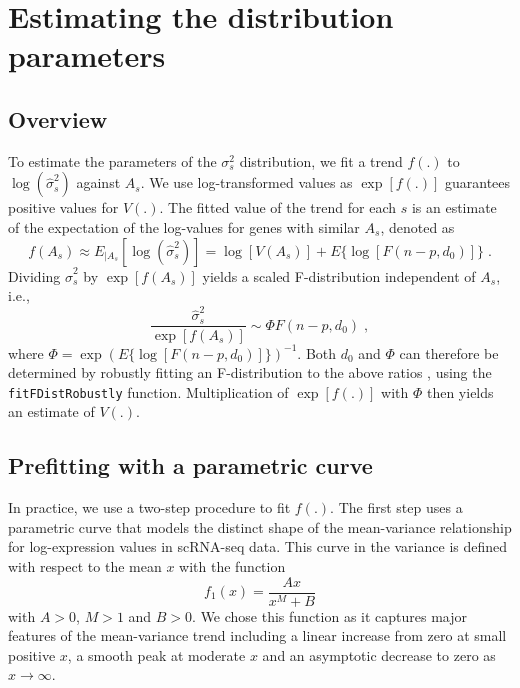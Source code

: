 \documentclass{article}
\begin{document}
\section{Estimating the distribution parameters}

\subsection{Overview}
To estimate the parameters of the $\sigma^2_s$ distribution, we fit a trend $f(.)$ to $\log(\hat\sigma^2_s)$ against $A_s$.
We use log-transformed values as $\exp[f(.)]$ guarantees positive values for $V(.)$.
The fitted value of the trend for each $s$ is an estimate of the expectation of the log-values for genes with similar $A_s$, denoted as
\[
    f(A_s) \approx E_{|A_s}[\log(\hat\sigma^2_s)] = \log[V(A_s)] + E\{\log[F(n-p, d_0)]\} \;.
\]
Dividing $\hat\sigma^2_s$ by $\exp[f(A_s)]$ yields a scaled F-distribution independent of $A_s$, i.e.,
\[
    \frac{\hat\sigma^2_s}{\exp[f(A_s)]} \sim \Phi F(n-p, d_0) \;,
\]
where $\Phi = \exp(E\{\log[F(n-p, d_0)]\})^{-1}$. 
Both $d_0$ and $\Phi$ can therefore be determined by robustly fitting an F-distribution to the above ratios \citep{phipson2016robust}, using the \texttt{fitFDistRobustly} function.
Multiplication of $\exp[f(.)]$ with $\Phi$ then yields an estimate of $V(.)$.

\subsection{Prefitting with a parametric curve}
In practice, we use a two-step procedure to fit $f(.)$.
The first step uses a parametric curve that models the distinct shape of the mean-variance relationship for log-expression values in scRNA-seq data.
This curve in the variance is defined with respect to the mean $x$ with the function
\begin{equation}
    f_1(x) = \frac{A x}{x^M + B} \label{eqn:paramtrend}
\end{equation}
with $A > 0$, $M > 1$ and $B > 0$.
We chose this function as it captures major features of the mean-variance trend including a linear increase from zero at small positive $x$, a smooth peak at moderate $x$ and an asymptotic decrease to zero as $x \to \infty$.
\end{document}
